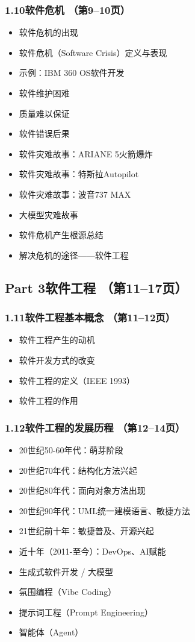 \documentclass[12pt,a4paper]{ctexart}
\begin{document}
\subsubsection{1.10\quad 软件危机 \hfill（第9--10页）}
\begin{itemize}
    \item 软件危机的出现
    \item 软件危机（Software Crisis）定义与表现
    \item 示例：IBM 360 OS软件开发
    \item 软件维护困难
    \item 质量难以保证
    \item 软件错误后果
    \item 软件灾难故事：ARIANE 5火箭爆炸
    \item 软件灾难故事：特斯拉Autopilot
    \item 软件灾难故事：波音737 MAX
    \item 大模型灾难故事
    \item 软件危机产生根源总结
    \item 解决危机的途径——软件工程
\end{itemize}

\subsection{Part 3\quad 软件工程 \hfill（第11--17页）}

\subsubsection{1.11\quad 软件工程基本概念 \hfill（第11--12页）}
\begin{itemize}
    \item 软件工程产生的动机
    \item 软件开发方式的改变
    \item 软件工程的定义（IEEE 1993）
    \item 软件工程的作用
\end{itemize}

\subsubsection{1.12\quad 软件工程的发展历程 \hfill（第12--14页）}
\begin{itemize}
    \item 20世纪50-60年代：萌芽阶段
    \item 20世纪70年代：结构化方法兴起
    \item 20世纪80年代：面向对象方法出现
    \item 20世纪90年代：UML统一建模语言、敏捷方法
    \item 21世纪前十年：敏捷普及、开源兴起
    \item 近十年（2011-至今）：DevOps、AI赋能
    \item 生成式软件开发 / 大模型
    \item 氛围编程（Vibe Coding）
    \item 提示词工程（Prompt Engineering）
    \item 智能体（Agent）
\end{itemize}
\end{document}
